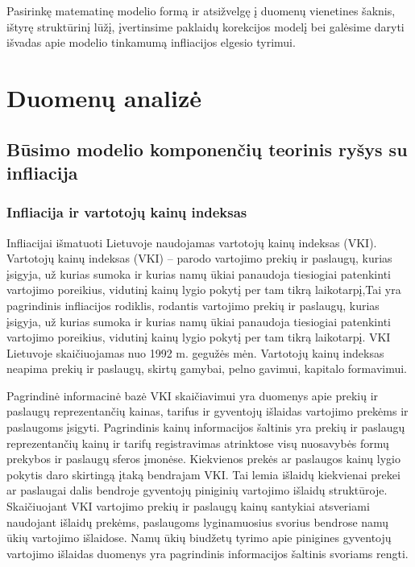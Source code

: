 \documentclass[a4paper]{article}
\begin{document}
Pasirinkę matematinę modelio formą ir atsižvelgę į duomenų vienetines šaknis, ištyrę struktūrinį lūžį, įvertinsime paklaidų korekcijos modelį bei galėsime daryti išvadas apie modelio tinkamumą infliacijos elgesio tyrimui.
\newpage

\section{Duomenų analizė}

\subsection{Būsimo modelio komponenčių teorinis ryšys su infliacija}

\subsubsection{Infliacija ir vartotojų kainų indeksas} \indent

Infliacijai išmatuoti Lietuvoje naudojamas vartotojų kainų indeksas (VKI). Vartotojų kainų indeksas (VKI) – parodo vartojimo prekių ir paslaugų, kurias įsigyja, už kurias sumoka ir kurias namų ūkiai panaudoja tiesiogiai patenkinti vartojimo poreikius, vidutinį kainų lygio pokytį per tam tikrą laikotarpį,Tai yra pagrindinis infliacijos rodiklis, rodantis vartojimo prekių ir paslaugų, kurias įsigyja, už kurias sumoka ir kurias namų ūkiai panaudoja tiesiogiai patenkinti vartojimo poreikius, vidutinį kainų lygio pokytį per tam tikrą laikotarpį. VKI Lietuvoje skaičiuojamas nuo 1992 m. gegužės mėn. Vartotojų kainų indeksas neapima prekių ir paslaugų, skirtų gamybai, pelno gavimui, kapitalo formavimui.

Pagrindinė informacinė bazė VKI skaičiavimui yra duomenys apie prekių ir paslaugų reprezentančių kainas, tarifus ir gyventojų išlaidas vartojimo prekėms ir paslaugoms įsigyti. Pagrindinis kainų informacijos šaltinis yra prekių ir paslaugų reprezentančių kainų ir tarifų registravimas atrinktose visų nuosavybės formų prekybos ir paslaugų sferos įmonėse. Kiekvienos prekės ar paslaugos kainų lygio pokytis daro skirtingą įtaką bendrajam VKI. Tai lemia išlaidų kiekvienai prekei ar paslaugai dalis bendroje gyventojų piniginių vartojimo išlaidų struktūroje. Skaičiuojant VKI vartojimo prekių ir paslaugų kainų santykiai atsveriami naudojant išlaidų prekėms, paslaugoms lyginamuosius svorius bendrose namų ūkių vartojimo išlaidose. Namų ūkių biudžetų tyrimo apie pinigines gyventojų vartojimo išlaidas duomenys yra pagrindinis informacijos šaltinis svoriams rengti.
\end{document}
